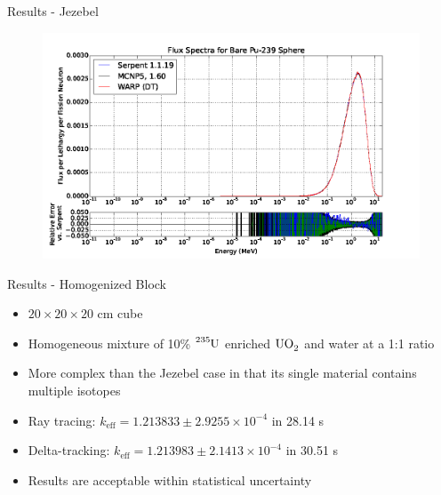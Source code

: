 \documentclass[xcolor=x11names, compress]{beamer}
\renewcommand{\(}{\begin{columns}}
\renewcommand{\)}{\end{columns}}
\newcommand{\<}[1]{\begin{column}{#1}}
\renewcommand{\>}{\end{column}}
\begin{document}
\begin{frame}{Results - Jezebel}
	\begin{figure}[h!]
	\includegraphics[width=1\linewidth]{../figs/jezebel-plot}
	\end{figure}
\end{frame}


\begin{frame}{Results - Homogenized Block}
	\begin{itemize}
	\item{$20\times20\times20$ cm cube}
	\item{Homogeneous mixture of 10\% $\ce{^{235}U}$ enriched $\ce{UO_2}$ and water at a 1:1 ratio}
	\item{More complex than the Jezebel case in that its single material contains multiple isotopes}
	\pause
	\vspace*{1 em}
	\item{Ray tracing: $k_{\mathrm{eff}} = 1.213833 \pm 2.9255 \times 10^{-4}$ in 28.14 s}
	\item{Delta-tracking: $k_{\mathrm{eff}} = 1.213983 \pm 2.1413 \times 10^{-4}$ in 30.51 s}
	\item{Results are acceptable within statistical uncertainty}
	\end{itemize}
\end{frame}
\end{document}
